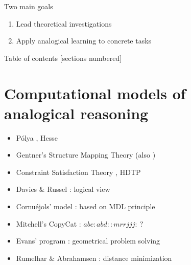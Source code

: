 \documentclass{beamer}
\begin{document}
\begin{frame}{Two main goals}
  \begin{enumerate}
    \item Lead \alert{theoretical} investigations
    \item Apply analogical learning to \alert{concrete} tasks
  \end{enumerate}
\end{frame}

\begin{frame}{Table of contents}
  [sections numbered]
  \tableofcontents[hideallsubsections]
\end{frame}

\section[Existing models]{Computational models of analogical reasoning}


\begin{frame}{}
  \begin{itemize}
    \item P\'olya \cite{Pol45}, Hesse  \cite{Hes59}
    \item Gentner's Structure Mapping Theory \cite{Gen83} (also \cite{Win80})
    \item Constraint Satisfaction Theory \cite{HolTha89}, HDTP \cite{GusKunSchTCS06}
    \item Davies \& Russel \cite{DavRus87}: logical view
    \item Cornuéjols' model \cite{CorJFA96}: based on MDL principle
    \item Mitchell's CopyCat \cite{Mit93}: $abc : abd :: mrrjjj :~?$
    \item \alert{Evans' program} \cite{Eva64}: geometrical problem solving
    \item \alert{Rumelhar \& Abrahamsen} \cite{RumAbr73}: distance minimization
  \end{itemize}

\end{frame}
\end{document}
